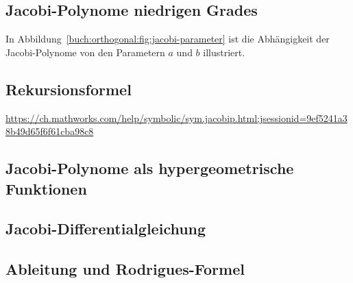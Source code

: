 %
% 
%
\subsection{Jacobi-Polynome niedrigen Grades}
In Abbildung~\ref{buch:orthogonal:fig:jacobi-parameter}
ist die Abhängigkeit der Jacobi-Polynome von den Parametern $a$ und $b$
illustriert.

%
%
%
\subsection{Rekursionsformel}
\url{https://ch.mathworks.com/help/symbolic/sym.jacobip.html;jsessionid=9ef5241a38b49d65f6f61cba98c8}

%
%
%
\subsection{Jacobi-Polynome als hypergeometrische Funktionen}

%
%
%
\subsection{Jacobi-Differentialgleichung}

%
%
%
\subsection{Ableitung und Rodrigues-Formel}




